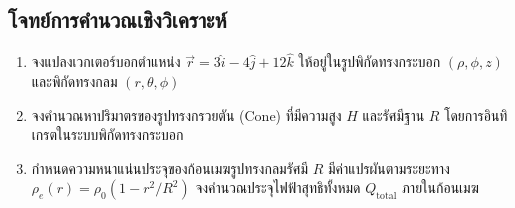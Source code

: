 \subsection{โจทย์การคำนวณเชิงวิเคราะห์}
\begin{enumerate}
    \item จงแปลงเวกเตอร์บอกตำแหน่ง $\vec{r} = 3\hat{i} - 4\hat{j} + 12\hat{k}$ ให้อยู่ในรูปพิกัดทรงกระบอก $(\rho, \phi, z)$ และพิกัดทรงกลม $(r, \theta, \phi)$
    \item จงคำนวณหาปริมาตรของรูปทรงกรวยตัน (Cone) ที่มีความสูง $H$ และรัศมีฐาน $R$ โดยการอินทิเกรตในระบบพิกัดทรงกระบอก
    \item กำหนดความหนาแน่นประจุของก้อนเมฆรูปทรงกลมรัศมี $R$ มีค่าแปรผันตามระยะทาง $\rho_e(r) = \rho_0 (1 - r^2/R^2)$ จงคำนวณประจุไฟฟ้าสุทธิทั้งหมด $Q_{\text{total}}$ ภายในก้อนเมฆ
\end{enumerate}
